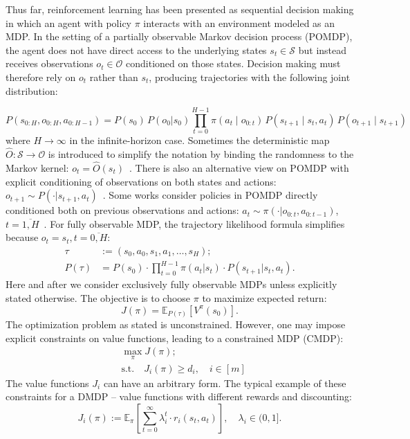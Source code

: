 \documentclass{article}
\numberwithin{equation}{section}
\begin{document}
Thus far, reinforcement learning has been presented as sequential decision making in which an agent with policy $\pi$ interacts with an environment modeled as an MDP. In the setting of a partially observable Markov decision process (POMDP), the agent does not have direct access to the underlying states $s_t\in\mathcal{S}$ but instead receives observations $o_t\in\mathcal{O}$ conditioned on those states. Decision making must therefore rely on $o_t$ rather than $s_t$, producing trajectories with the following joint distribution:

\begin{equation}
\label{eq:pomdp_def}
P(s_{0:H}, o_{0:H}, a_{0:H-1})
=
P(s_0)\,P(o_0 | s_0)
\prod_{t=0}^{H-1}\!
\pi(a_t \mid o_{0:t})\,
P(s_{t+1} \mid s_t, a_t)\,
P(o_{t+1} \mid s_{t+1})
\end{equation}
where $H\rightarrow\infty$ in the infinite-horizon case. 
Sometimes the deterministic map $\hat{O}: \mathcal{S}\to\mathcal{O}$ is introduced to simplify the notation by binding the randomness to the Markov kernel: $o_t  = \hat{O}(s_t)$~\cite{zhang2025landscape}. There is also an alternative view on POMDP with explicit conditioning of observations on both states and actions: $o_{t + 1}\sim P(\cdot|s_{t + 1}, a_t)$~\cite{kochenderfer2022algorithms}. Some works consider policies in POMDP directly conditioned both on previous observations and actions: $a_t\sim\pi(\cdot|o_{0:t}, a_{0:t - 1})$, $t=\overline{1, H}$~\cite{arcieri2025deep}. For fully observable MDP, the trajectory likelihood formula simplifies because $o_t = s_t, t = \overline{0, H}$:
\begin{equation*}
    \begin{aligned}
        \tau &:= (s_0, a_0, s_1, a_1, \dots, s_H);\\
        P(\tau) &= P(s_0)\cdot\prod_{t = 0}^{H - 1}\pi(a_t|s_t)\cdot P(s_{t + 1}|s_t, a_t).
    \end{aligned}
\end{equation*}
Here and after we consider exclusively fully observable MDPs unless explicitly stated otherwise. The objective is to choose $\pi$ to maximize expected return:
$$J(\pi) = \mathbb{E}_{P(\tau)}\left[V^{\pi}(s_0)\right].$$
The optimization problem as stated is unconstrained. However, one may impose explicit constraints on value functions, leading to a constrained MDP (CMDP):
\begin{equation}
    \begin{aligned}
        &\max\limits_{\pi}J(\pi);\\
        &\text{s.t.}\quad J_i(\pi)\geq d_i, \quad i\in[m]
    \end{aligned}
\end{equation}
The value functions $J_i$ can have an arbitrary form. The typical example of these constraints for a DMDP -- value functions with different rewards and discounting:
$$J_i(\pi) := \mathbb{E}_{\pi}\left[\sum\limits_{t = 0}^{\infty}\lambda_i^t\cdot r_i(s_t, a_t)\right],\quad\lambda_i\in(0, 1].$$
\end{document}

